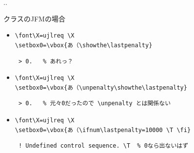 \documentclass[a5paper,dvipdfmx,14pt]{beamer}
\begin{document}
\begin{frame}[t,fragile]{\insertsectionnumber.\insertsubsectionnumber. \insertsubsection}{}
{\footnotesize
{}クラスのJFMの場合
\begin{itemize}
  \item \verb+\font\X=ujlreq \X+\\
        \verb+\setbox0=\vbox{あ（\showthe\lastpenalty}+
\begin{verbnote}
\begin{verbatim}
 > 0.   % あれっ？
\end{verbatim}
\end{verbnote}
\end{itemize}\vskip-20pt
\begin{itemize}
  \item \verb+\font\X=ujlreq \X+\\
        \verb+\setbox0=\vbox{あ（\unpenalty\showthe\lastpenalty}+
\begin{verbnote}
\begin{verbatim}
 > 0.   % 元々0だったので \unpenalty とは関係ない
\end{verbatim}
\end{verbnote}
\end{itemize}\vskip-20pt
\begin{itemize}
  \item \verb+\font\X=ujlreq \X+\\
        \verb+\setbox0=\vbox{あ（\ifnum\lastpenalty=10000 \T \fi}+
\begin{verbnote}
\begin{verbatim}
 ! Undefined control sequence. \T  % 0なら出ないはず
\end{verbatim}
\end{verbnote}
\end{itemize}\vskip-20pt
}
\end{frame}
\end{document}
